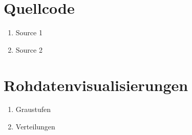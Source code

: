 \documentclass[11pt, a4paper, headinclude, footinclude=true, oneside]{scrreprt}
\author{Nicolas Harrje} %
\begin{document}






%

\clearpage
\makeatletter
\renewcommand*{\@dotsep}{1} %
\makeatother
\tableofcontents

\cleardoublepage
{}








\nocite{Segmentation} %
\nocite{ImageAttack}

\clearpage
%



\clearpage
{}


\clearpage
{}
\listoffigures

\clearpage
{}
\listoftables
{}

\appendix
%
\chapter{Quellcode}
\begin{enumerate}
      \item Source 1
      \item Source 2
\end{enumerate}



\chapter{Rohdatenvisualisierungen}
\begin{enumerate}
      \item Graustufen
      \item Verteilungen
\end{enumerate}
\end{document}
